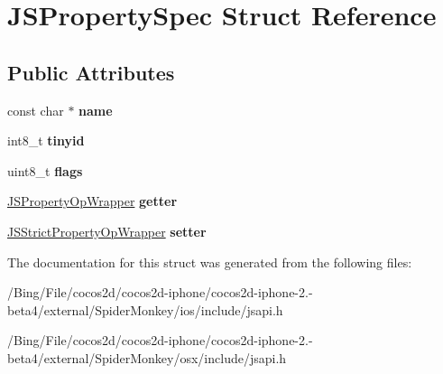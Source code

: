 \hypertarget{struct_j_s_property_spec}{\section{J\-S\-Property\-Spec Struct Reference}
\label{struct_j_s_property_spec}
}
\subsection*{Public Attributes}
\begin{DoxyCompactItemize}
\item 
\hypertarget{struct_j_s_property_spec_ad19b6890899aa3898f4680aed8be5a65}{const char $\ast$ {\bfseries name}}\label{struct_j_s_property_spec_ad19b6890899aa3898f4680aed8be5a65}

\item 
\hypertarget{struct_j_s_property_spec_a566837107de2680a393982e3c5fdfa57}{int8\-\_\-t {\bfseries tinyid}}\label{struct_j_s_property_spec_a566837107de2680a393982e3c5fdfa57}

\item 
\hypertarget{struct_j_s_property_spec_ab44afa04f38dde2dbdf5c714db46447e}{uint8\-\_\-t {\bfseries flags}}\label{struct_j_s_property_spec_ab44afa04f38dde2dbdf5c714db46447e}

\item 
\hypertarget{struct_j_s_property_spec_abaa18a3e7f93b25d90ddda02ece1c18b}{\hyperlink{struct_j_s_property_op_wrapper}{J\-S\-Property\-Op\-Wrapper} {\bfseries getter}}\label{struct_j_s_property_spec_abaa18a3e7f93b25d90ddda02ece1c18b}

\item 
\hypertarget{struct_j_s_property_spec_ae7a633a04a38d08e6e0cc740f9ceb5fc}{\hyperlink{struct_j_s_strict_property_op_wrapper}{J\-S\-Strict\-Property\-Op\-Wrapper} {\bfseries setter}}\label{struct_j_s_property_spec_ae7a633a04a38d08e6e0cc740f9ceb5fc}

\end{DoxyCompactItemize}


The documentation for this struct was generated from the following files\-:\begin{DoxyCompactItemize}
\item 
/\-Bing/\-File/cocos2d/cocos2d-\/iphone/cocos2d-\/iphone-\/2.-\/beta4/external/\-Spider\-Monkey/ios/include/jsapi.\-h\item 
/\-Bing/\-File/cocos2d/cocos2d-\/iphone/cocos2d-\/iphone-\/2.-\/beta4/external/\-Spider\-Monkey/osx/include/jsapi.\-h\end{DoxyCompactItemize}

